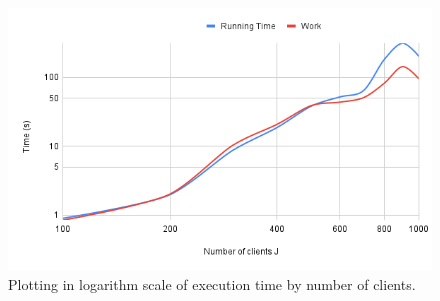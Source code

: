 \documentclass[11pt]{article}
\theoremstyle{definition}
\theoremstyle{definition}
\theoremstyle{remark}
\theoremstyle{remark}
\theoremstyle{remark}
\theoremstyle{remark}
\theoremstyle{definition}
\begin{document}
\begin{figure}[htbp]
\centering
\includegraphics[width=.9\linewidth]{./chart.png}
\caption{Plotting in logarithm scale of execution time by number of clients.}
\end{figure}
\end{document}
